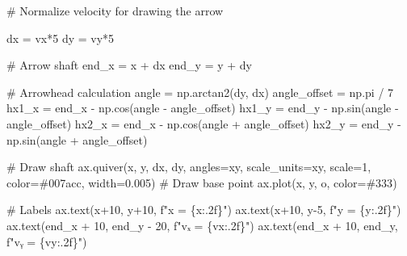 \documentclass[
  letterpaper,
  DIV=11,
  numbers=noendperiod]{scrreprt}
\newenvironment{Shaded}{\begin{snugshade}}{\end{snugshade}}
\newcommand{\CommentTok}[1]{\textcolor[rgb]{0.37,0.37,0.37}{#1}}
\newcommand{\DecValTok}[1]{\textcolor[rgb]{0.68,0.00,0.00}{#1}}
\newcommand{\FloatTok}[1]{\textcolor[rgb]{0.68,0.00,0.00}{#1}}
\newcommand{\NormalTok}[1]{\textcolor[rgb]{0.00,0.23,0.31}{#1}}
\newcommand{\OperatorTok}[1]{\textcolor[rgb]{0.37,0.37,0.37}{#1}}
\newcommand{\SpecialCharTok}[1]{\textcolor[rgb]{0.37,0.37,0.37}{#1}}
\newcommand{\SpecialStringTok}[1]{\textcolor[rgb]{0.13,0.47,0.30}{#1}}
\newcommand{\StringTok}[1]{\textcolor[rgb]{0.13,0.47,0.30}{#1}}
\theoremstyle{definition}
\theoremstyle{remark}
\begin{document}
\begin{tcolorbox}
\begin{Shaded}
\begin{Highlighting}[]
    \CommentTok{\# Normalize velocity for drawing the arrow}
    
\NormalTok{    dx }\OperatorTok{=}\NormalTok{ vx}\OperatorTok{*}\DecValTok{5}
\NormalTok{    dy }\OperatorTok{=}\NormalTok{ vy}\OperatorTok{*}\DecValTok{5}

    \CommentTok{\# Arrow shaft}
\NormalTok{    end\_x }\OperatorTok{=}\NormalTok{ x }\OperatorTok{+}\NormalTok{ dx}
\NormalTok{    end\_y }\OperatorTok{=}\NormalTok{ y }\OperatorTok{+}\NormalTok{ dy}

    \CommentTok{\# Arrowhead calculation}
\NormalTok{    angle }\OperatorTok{=}\NormalTok{ np.arctan2(dy, dx)}
\NormalTok{    angle\_offset }\OperatorTok{=}\NormalTok{ np.pi }\OperatorTok{/} \DecValTok{7}
\NormalTok{    hx1\_x }\OperatorTok{=}\NormalTok{ end\_x }\OperatorTok{{-}}\NormalTok{ np.cos(angle }\OperatorTok{{-}}\NormalTok{ angle\_offset)}
\NormalTok{    hx1\_y }\OperatorTok{=}\NormalTok{ end\_y }\OperatorTok{{-}}\NormalTok{ np.sin(angle }\OperatorTok{{-}}\NormalTok{ angle\_offset)}
\NormalTok{    hx2\_x }\OperatorTok{=}\NormalTok{ end\_x }\OperatorTok{{-}}\NormalTok{ np.cos(angle }\OperatorTok{+}\NormalTok{ angle\_offset)}
\NormalTok{    hx2\_y }\OperatorTok{=}\NormalTok{ end\_y }\OperatorTok{{-}}\NormalTok{ np.sin(angle }\OperatorTok{+}\NormalTok{ angle\_offset)}

    \CommentTok{\# Draw shaft}
\NormalTok{    ax.quiver(x, y, dx, dy, angles}\OperatorTok{=}\StringTok{\textquotesingle{}xy\textquotesingle{}}\NormalTok{, scale\_units}\OperatorTok{=}\StringTok{\textquotesingle{}xy\textquotesingle{}}\NormalTok{, scale}\OperatorTok{=}\DecValTok{1}\NormalTok{, color}\OperatorTok{=}\StringTok{\textquotesingle{}\#007acc\textquotesingle{}}\NormalTok{, width}\OperatorTok{=}\FloatTok{0.005}\NormalTok{)}
    \CommentTok{\# Draw base point}
\NormalTok{    ax.plot(x, y, }\StringTok{\textquotesingle{}o\textquotesingle{}}\NormalTok{, color}\OperatorTok{=}\StringTok{\textquotesingle{}\#333\textquotesingle{}}\NormalTok{)}

    \CommentTok{\# Labels}
\NormalTok{    ax.text(x}\OperatorTok{+}\DecValTok{10}\NormalTok{, y}\OperatorTok{+}\DecValTok{10}\NormalTok{, }\SpecialStringTok{f"x = }\SpecialCharTok{\{}\NormalTok{x}\SpecialCharTok{:.2f\}}\SpecialStringTok{"}\NormalTok{)}
\NormalTok{    ax.text(x}\OperatorTok{+}\DecValTok{10}\NormalTok{, y}\OperatorTok{{-}}\DecValTok{5}\NormalTok{, }\SpecialStringTok{f"y = }\SpecialCharTok{\{}\NormalTok{y}\SpecialCharTok{:.2f\}}\SpecialStringTok{"}\NormalTok{)}
\NormalTok{    ax.text(end\_x }\OperatorTok{+} \DecValTok{10}\NormalTok{, end\_y }\OperatorTok{{-}} \DecValTok{20}\NormalTok{, }\SpecialStringTok{f"vₓ = }\SpecialCharTok{\{}\NormalTok{vx}\SpecialCharTok{:.2f\}}\SpecialStringTok{"}\NormalTok{)}
\NormalTok{    ax.text(end\_x }\OperatorTok{+} \DecValTok{10}\NormalTok{, end\_y, }\SpecialStringTok{f"vᵧ = }\SpecialCharTok{\{}\NormalTok{vy}\SpecialCharTok{:.2f\}}\SpecialStringTok{"}\NormalTok{)}


\end{Highlighting}
\end{Shaded}
\end{tcolorbox}
\end{document}
